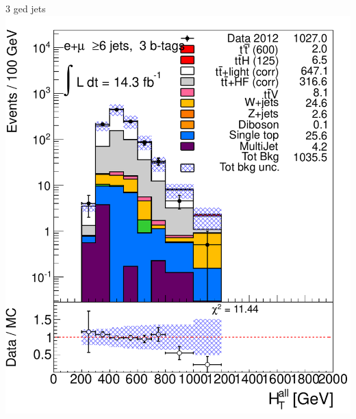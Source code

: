 \begin{frame}
\begin{minipage}{.45\textwidth}
 3 \btag ged jets\\
\includegraphics[width=.8\textwidth]{pics/htx_httails/HTAll_ELEMUON_6jetin3btagex_NOMINAL_logscale}

\end{minipage}

\end{frame}


